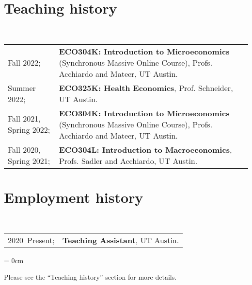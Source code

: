 \documentclass[a4paper, 10pt]{article}
\begin{document}
  \section{Teaching history}
  ~\begin{tabular}{l p{12cm}}
    Fall 2022; & \textbf{ECO304K: Introduction to Microeconomics} (Synchronous Massive Online Course), Profs. Acchiardo and Mateer, UT Austin.\\
    Summer 2022; & \textbf{ECO325K: Health Economics}, Prof. Schneider, UT Austin.\\
    Fall 2021, Spring 2022; & \textbf{ECO304K: Introduction to Microeconomics} (Synchronous Massive Online Course), Profs. Acchiardo and Mateer, UT Austin.\\
    Fall 2020, Spring 2021; & \textbf{ECO304L: Introduction to Macroeconomics}, Profs. Sadler and Acchiardo, UT Austin.\\
  \end{tabular}
  \vspace*{-0.5em}

  \section{Employment history}
  ~\begin{tabular}{ll}
    2020--Present; & \textbf{Teaching Assistant}, UT Austin.
  \end{tabular}
  \begin{compactitem}\parskip = 0cm
    \item Please see the ``Teaching history'' section for more details.
  \end{compactitem}
  \vspace*{1.25em}
\end{document}
